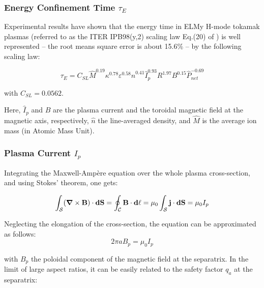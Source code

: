 \subsubsection{Energy Confinement Time $\tau_E$}
Experimental results have shown that the energy time in ELMy H-mode tokamak plasmas (referred to as the ITER IPB98(y,2) scaling law Eq.(20) of ) is well represented -- the root means square error is about 15.6\% -- by the following scaling law:

\begin{equation}
	\tau_E = C_{SL} \hat M^{0.19} \kappa^{0.78} \varepsilon^{0.58} 
	\hat n^{0.41} \hat I_p^{0.93} R^{1.97} B^{0.15}  \hat P_{net}^{-0.69}
	\label{eq:scaling_law_IPB98(y,2)_adv}
\end{equation}

\noindent
with $C_{SL} = 0.0562$.


Here, $\hat I_p$ and $B$ are the plasma current and the toroidal magnetic field at the magnetic axis, respectively, $\hat n$ the line-averaged density, and $\hat M$ is the average ion mass (in Atomic Mass Unit). 





\subsubsection{Plasma Current $I_p$}

Integrating the Maxwell-Ampère equation over the whole plasma cross-section, and using Stokes' theorem, one gets:

\begin{equation*}
\int_\mathcal{S} (\mbox{\boldmath${\nabla}$}\times {\mathbf B}) \cdot \mathbf{dS} = 
\oint_\mathcal{C} \mathbf{B} \cdot \mathbf{d\ell}
= \mu_0 \int_\mathcal{S} {\mathbf j} \cdot \mathbf{dS} = \mu_0 I_p
\end{equation*}

Neglecting the elongation of the cross-section, the equation can be approximated as follows:
$$
2\pi a B_p = \mu_0 I_p
$$

\noindent
with $B_p$ the poloidal component of the magnetic field at the separatrix. In the limit of large aspect ratios, it can be easily related to the safety factor $q_a$ at the separatrix:

